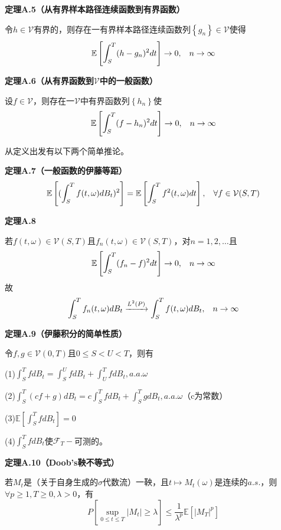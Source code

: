 \documentclass[UTF8，12pt]{ctexart}
\numberwithin{equation}{section}
\begin{document}
\vspace{0.3cm}
\noindent \textbf{定理A.5（从有界样本路径连续函数到有界函数）}

令$h\in\mathcal{V}$有界的，则存在一有界样本路径连续函数列$\left\{g_n\right\}\in\mathcal{V}$使得
\[
\mathbb{E}\left[\int_{S}^{T}(h-g_n)^2dt\right]\to 0,\hspace{0.3cm}n\to\infty
\]

\vspace{0.3cm}
\noindent \textbf{定理A.6（从有界函数到$\mathcal{V}$中的一般函数）}

设$f\in\mathcal{V}$，则存在一$\mathcal{V}$中有界函数列$\left\{h_n\right\}$使
\[
\mathbb{E}\left[\int_{S}^{T}(f-h_n)^2dt\right]\to 0,\hspace{0.3cm}n\to\infty
\]

从定义出发有以下两个简单推论。

\vspace{0.3cm}
\noindent \textbf{定理A.7（一般函数的伊藤等距）}
\[
\mathbb{E}\left[(\int_{S}^{T}f(t,\omega)dB_t)^2\right]=\mathbb{E}\left[\int_{S}^{T}f^2(t,\omega)dt\right],\hspace{0.3cm}\forall f\in\mathcal{V}(S,T)
\]

\vspace{0.3cm}
\noindent \textbf{定理A.8}

若$f(t,\omega)\in\mathcal{V}(S,T)$且$f_n(t,\omega)\in\mathcal{V}(S,T)$，对$n=1,2,\ldots$且
\[
\mathbb{E}\left[\int_{S}^{T}(f_n-f)^2 dt\right]\to 0,\hspace{0.3cm}n\to\infty
\]
故
\[
\int_{S}^{T}f_n(t,\omega)dB_t\xrightarrow{L^2(P)}\int_{S}^{T}f(t,\omega)dB_t,\hspace{0.3cm}n\to\infty
\]

\vspace{0.3cm}
\noindent \textbf{定理A.9（伊藤积分的简单性质）}

令$f,g\in\mathcal{V}(0,T)$且$0\le S<U<T$，则有

\noindent(1)$\int_{S}^{T}fdB_t=\int_{S}^{U}fdB_t+\int_{U}^{T}fdB_t,a.a.\omega$

\noindent(2)$\int_{S}^{T}(cf+g)dB_t=c\int_{S}^{T}fdB_t+\int_{S}^{T}gdB_t,a.a.\omega$（c为常数）

\noindent(3)$\mathbb{E}\left[\int_{S}^{T}fdB_t\right]=0$

\noindent(4)$\int_{S}^{T}fdB_t$使$\mathcal{F}_T-$可测的。

\vspace{0.3cm}
\noindent \textbf{定理A.10（Doob's鞅不等式）}

若$M_t$是（关于自身生成的$\sigma$代数流）一鞅，且$t\mapsto M_t(\omega)$是连续的$a.s.$，则$\forall p\ge 1,T\ge 0,\lambda>0$，有
\[
P[\sup_{0\le t\le T}\left\vert M_t\right\vert\ge\lambda]\le\frac{1}{\lambda^p}\mathbb{E}[\left\vert M_T\right\vert^p]
\]
\end{document}
